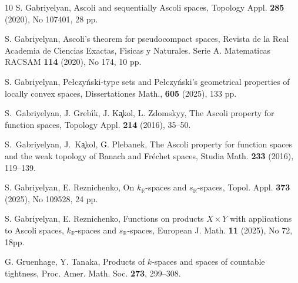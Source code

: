 \documentclass[preprint,11pt]{elsarticle}
\numberwithin{equation}{section}
\numberwithin{theorem}{section}
\newcommand{\IR}{\mathbb{R}}
\newcommand{\CC}{C_k}
\begin{document}
\begin{thebibliography}{10}
S. Gabriyelyan, Ascoli and sequentially Ascoli spaces, Topology Appl. \textbf{285} (2020), No 107401, 28 pp.

S. Gabriyelyan, Ascoli's theorem for pseudocompact spaces, Revista de la Real Academia de Ciencias Exactas, Fisicas y Naturales. Serie A. Matematicas RACSAM \textbf{114} (2020), No 174, 10 pp.



S. Gabriyelyan, Pe{\l}czy\'{n}ski-type sets and Pe{\l}czy\'{n}ski's geometrical properties of locally convex spaces, Dissertationes Math., \textbf{605} (2025), 133 pp.



S.~Gabriyelyan, J.  Greb\'{\i}k, J. K\c{a}kol, L. Zdomskyy,  The Ascoli property for function spaces, Topology Appl. \textbf{214} (2016), 35--50.


S.~Gabriyelyan, J.~K{\c{a}}kol,  G. Plebanek, The Ascoli property for function spaces and the weak topology of Banach and Fr\'echet spaces, Studia Math. \textbf{233} (2016), 119--139.

S. Gabriyelyan, E. Reznichenko, On $k_\IR$-spaces and  $s_\IR$-spaces, Topol. Appl. \textbf{373} (2025), No 109528, 24 pp.



S. Gabriyelyan, E. Reznichenko, Functions on products $X \times Y$ with applications to  Ascoli spaces, $k_\IR$-spaces and $s_\IR$-spaces, European J. Math. \textbf{11} (2025), No 72, 18pp.


G. Gruenhage, Y. Tanaka, Products of $k$-spaces and spaces of countable tightness, Proc. Amer. Math. Soc. \textbf{273}, 299--308.


\end{thebibliography}
\end{document}
